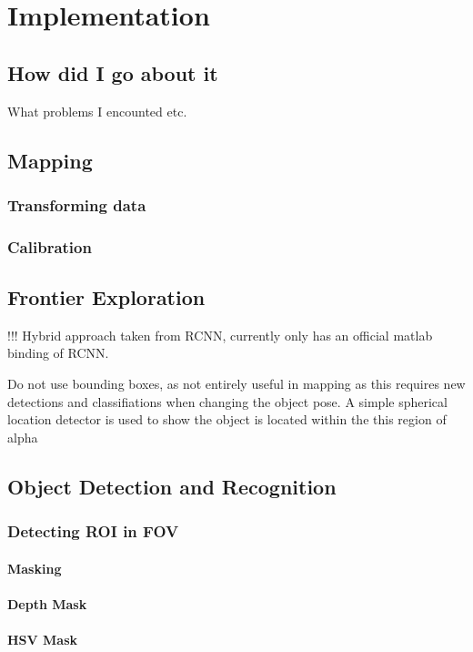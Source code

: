 \documentclass{mproj}
\begin{document}
\chapter{Implementation}

\section{How did I go about it}
What problems I encounted etc.
\section{Mapping}
\subsection{Transforming data}
\subsection{Calibration}

\section{Frontier Exploration} !!!
Hybrid approach taken from RCNN, currently only has an official matlab binding of RCNN.

Do not use bounding boxes, as not entirely useful in mapping as this requires new detections and classifiations when changing the object pose. A simple spherical location detector is used to show the object is located within the this region of alpha

\section{Object Detection and Recognition}
\subsection{Detecting ROI in FOV}
\subsubsection{Masking}
\subsubsection{Depth Mask}
\subsubsection{HSV Mask}
\end{document}
